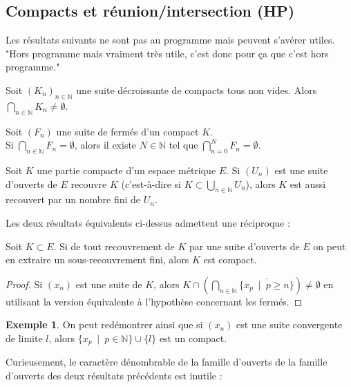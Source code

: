 \documentclass[french]{article}
\newcommand{\N}{\mathbb{N}}
\theoremstyle{plain}
\theoremstyle{definition}
\newtheorem*{ex}{Exemple}
\theoremstyle{remark}
\begin{document}
\subsection{Compacts et réunion/intersection (HP)}

Les résultats suivants ne sont pas au programme mais peuvent s'avérer utiles. \\
"Hors programme mais vraiment très utile, c'est donc pour ça que c'est hors programme."

\begin{thm}
	Soit $(K_n)_{n\in\N}$ une suite décroissante de compacts tous non vides. Alors $\displaystyle\bigcap_{n\in\N}K_n\ne\emptyset$.
\end{thm}

\begin{cor}%
	Soit $(F_n)$ une suite de fermés d'un compact $K$. \\
	Si $\displaystyle\bigcap_{n\in\N} F_n=\emptyset$, alors il existe $N\in\N$ tel que $\displaystyle\bigcap_{n=0}^NF_n=\emptyset$.
\end{cor}

\begin{cor}%
	Soit $K$ une partie compacte d'un espace métrique $E$. Si $(U_n)$ est une suite d'ouverts de $E$ recouvre $K$ (c'est-à-dire si $K\subset\displaystyle\bigcup_{n\in\N}U_n$), alors $K$ est aussi recouvert par un nombre fini de $U_n$.
\end{cor}

Les deux résultats équivalents ci-dessus admettent une réciproque :

\begin{prop}%
	Soit $K\subset E$. Si de tout recouvrement de $K$ par une suite d'ouverts de $E$ on peut en extraire un sous-recouvrement fini, alors $K$ est compact.
\end{prop}
\begin{proof}
	Si $(x_n)$ est une suite de $K$, alors $K\cap\displaystyle\left(\bigcap_{n\in\N}\overline{\{x_p\ \mid\ p\geqslant n\}}\right)\ne\emptyset$ en utilisant la version équivalente à l'hypothèse concernant les fermés.
\end{proof}

\begin{ex}
	On peut redémontrer ainsi que si $(x_n)$ est une suite convergente de limite $l$, alors $\{x_p\ \mid\ p\in\N\}\cup\{l\}$ est un compact.
\end{ex}

Curieusement, le caractère dénombrable de la famille d'ouverts de la famille d'ouverts des deux résultats précédents est inutile :
\end{document}
